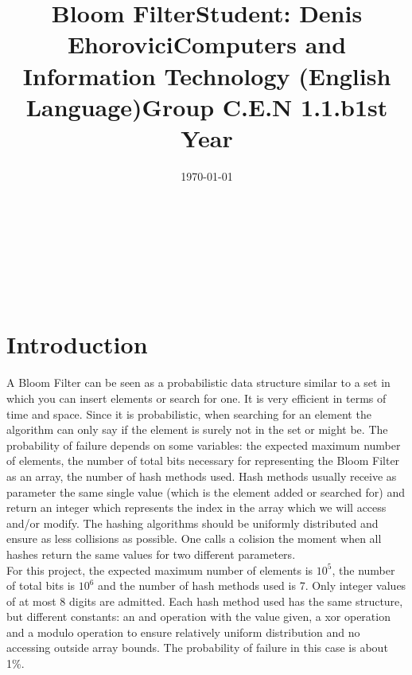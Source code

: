 \documentclass[14pt]{article}
\begin{document}
\title{\huge Bloom Filter}
\date{\today}
\maketitle
\begin{center}
\vspace{30 mm}

\title{\huge Student: Denis Ehorovici}
\\\vspace{10 mm}
\title{\huge Computers and Information Technology (English Language)}
\\\vspace{10 mm}
\title{\huge Group C.E.N 1.1.b}
\\\vspace{10 mm}
\title{\huge 1st Year}
\date{}
\maketitle

\newpage
\section*{Introduction}
\vspace{20 mm}
A Bloom Filter can be seen as a probabilistic data structure similar to a set in which you can insert elements or search for one. It is very efficient in terms of time and space. Since it is probabilistic, when searching for an element the algorithm can only say if the element is surely not in the set or might be. The probability of failure depends on some variables: the expected maximum number of elements, the number of total bits necessary for representing the Bloom Filter as an array, the number of hash methods used. Hash methods usually receive as parameter the same single value (which is the element added or searched for) and return an integer which represents the index in the array which we will access and/or modify. The hashing algorithms should be uniformly distributed and ensure as less collisions as possible. One calls a colision the moment when all hashes return the same values for two different parameters.
\\\vspace{20 mm}
For this project, the expected maximum number of elements is $10^{5}$, the number of total bits is $10^{6}$ and the number of hash methods used is 7. Only integer values of at most 8 digits are admitted. Each hash method used has the same structure, but different constants: an and operation with the value given, a xor operation and a modulo operation to ensure relatively uniform distribution and no accessing outside array bounds.  The probability of failure in this case is about 1\%.

\newpage
\end{center}
\end{document}
